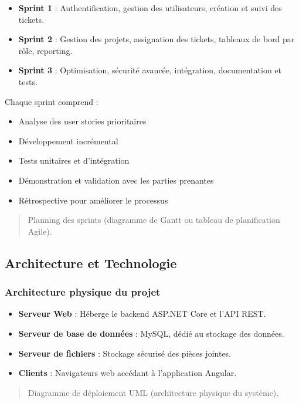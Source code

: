 \begin{itemize}
    \item \textbf{Sprint 1} : Authentification, gestion des utilisateurs, création et suivi des tickets.
    \item \textbf{Sprint 2} : Gestion des projets, assignation des tickets, tableaux de bord par rôle, reporting.
    \item \textbf{Sprint 3} : Optimisation, sécurité avancée, intégration, documentation et tests.
\end{itemize}

Chaque sprint comprend :
\begin{itemize}
    \item Analyse des user stories prioritaires
    \item Développement incrémental
    \item Tests unitaires et d'intégration
    \item Démonstration et validation avec les parties prenantes
    \item Rétrospective pour améliorer le processus
\end{itemize}

\begin{quote}
    Planning des sprints (diagramme de Gantt ou tableau de planification Agile).
\end{quote}

\subsection{Architecture et Technologie}
\label{sec:architecture-et-technologie}

\subsubsection{Architecture physique du projet}
\label{sec:architecture-physique}
\begin{itemize}
    \item \textbf{Serveur Web} : Héberge le backend ASP.NET Core et l'API REST.
    \item \textbf{Serveur de base de données} : MySQL, dédié au stockage des données.
    \item \textbf{Serveur de fichiers} : Stockage sécurisé des pièces jointes.
    \item \textbf{Clients} : Navigateurs web accédant à l'application Angular.
\end{itemize}

\begin{quote}
    Diagramme de déploiement UML (architecture physique du système).
\end{quote}

